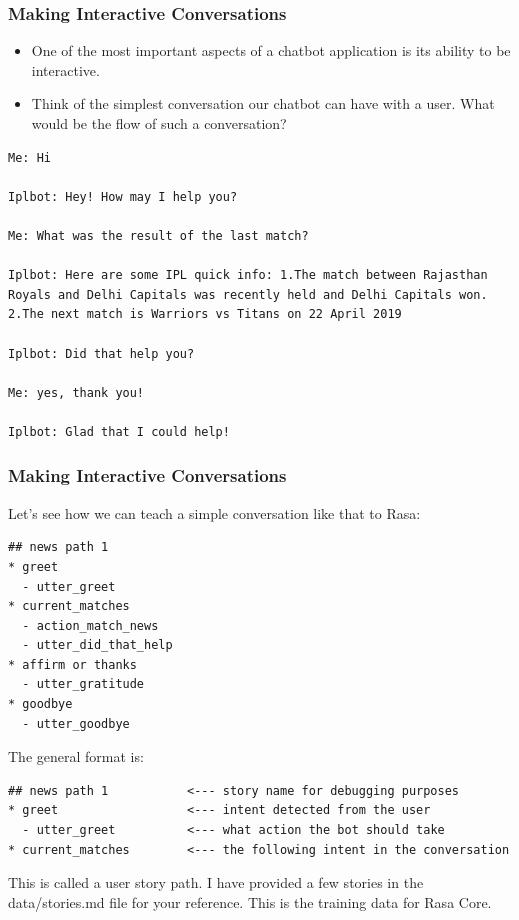  \begin{frame}[fragile]\frametitle{Making Interactive Conversations}

 
\begin{itemize}
\item  One of the most important aspects of a chatbot application is its ability to be interactive.
 
\item Think of the simplest conversation our chatbot can have with a user. What would be the flow of such a conversation?
\end{itemize}
\begin{lstlisting}
Me: Hi

Iplbot: Hey! How may I help you?

Me: What was the result of the last match?

Iplbot: Here are some IPL quick info: 1.The match between Rajasthan Royals and Delhi Capitals was recently held and Delhi Capitals won. 2.The next match is Warriors vs Titans on 22 April 2019

Iplbot: Did that help you?

Me: yes, thank you!

Iplbot: Glad that I could help!
\end{lstlisting}
\end{frame}

 \begin{frame}[fragile]\frametitle{Making Interactive Conversations}

Let’s see how we can teach a simple conversation like that to Rasa:

\begin{lstlisting}
## news path 1
* greet
  - utter_greet
* current_matches
  - action_match_news
  - utter_did_that_help
* affirm or thanks
  - utter_gratitude
* goodbye
  - utter_goodbye
\end{lstlisting}

The general format is:

\begin{lstlisting}
## news path 1           <--- story name for debugging purposes
* greet                  <--- intent detected from the user
  - utter_greet          <--- what action the bot should take
* current_matches        <--- the following intent in the conversation
\end{lstlisting}

This is called a user story path. I have provided a few stories in the data/stories.md file for your reference. This is the training data for Rasa Core.
\end{frame}


